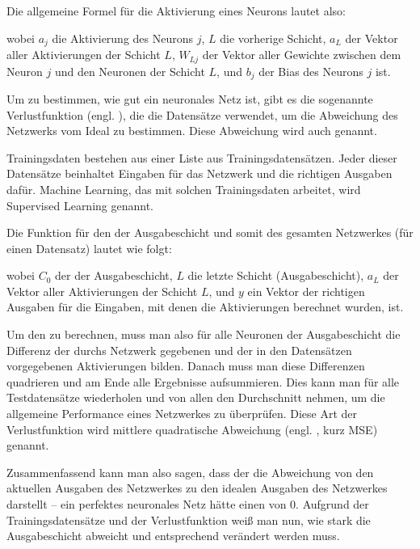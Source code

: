 \documentclass[11pt]{scrartcl}
\begin{document}
	Die allgemeine Formel für die Aktivierung eines Neurons lautet also:


	\form{
	\[
		\sig(x)=\frac{1}{1+e^{-x}}
		\]
	\[
		a_{j} = \sig\left(\sum_{L} (a_{L} * W_{Lj}) + b_{j}\right)
		\]}
	
	\noindent wobei $a_j$ die Aktivierung des Neurons $j$, $L$ die vorherige Schicht, $a_L$ der Vektor aller Aktivierungen der Schicht $L$, $W_{Lj}$ der Vektor aller Gewichte zwischen dem Neuron $j$ und den Neuronen der Schicht $L$, und $b_j$ der Bias des Neurons $j$ ist. \cite{brotcrunsher:forwardpass}	
	

	Um zu bestimmen, wie gut ein neuronales Netz ist, gibt es die sogenannte Verlustfunktion (engl. ), die die Datensätze verwendet, um die Abweichung des Netzwerks vom Ideal zu bestimmen. Diese Abweichung wird auch  genannt.

	Trainingsdaten bestehen aus einer Liste aus Trainingsdatensätzen. Jeder dieser Datensätze beinhaltet Eingaben für das Netzwerk und die richtigen Ausgaben dafür. Machine Learning, das mit solchen Trainingsdaten arbeitet, wird Supervised Learning genannt.

	Die Funktion für den  der Ausgabeschicht und somit des gesamten Netzwerkes (für einen Datensatz) lautet wie folgt:

	\form{ \[
		C_0 = (a_L - y)^2
	\]}


	\noindent wobei $C_0$ der  der Ausgabeschicht, $L$ die letzte Schicht (Ausgabeschicht), $a_L$ der Vektor aller Aktivierungen der Schicht $L$, und $y$ ein Vektor der richtigen Ausgaben für die Eingaben, mit denen die Aktivierungen berechnet wurden, ist. 
	
	Um den  zu berechnen, muss man also für alle Neuronen der Ausgabeschicht die Differenz der durchs Netzwerk gegebenen und der in den Datensätzen vorgegebenen Aktivierungen bilden. Danach muss man diese Differenzen quadrieren und am Ende alle Ergebnisse aufsummieren. Dies kann man für alle Testdatensätze wiederholen und von allen  den Durchschnitt nehmen, um die allgemeine Performance eines Netzwerkes zu überprüfen. Diese Art der Verlustfunktion wird mittlere quadratische Abweichung (engl. , kurz MSE) genannt.
	
	Zusammenfassend kann man also sagen, dass der  die Abweichung von den aktuellen Ausgaben des Netzwerkes zu den idealen Ausgaben des Netzwerkes darstellt -- ein perfektes neuronales Netz hätte einen  von 0. Aufgrund der Trainingsdatensätze und der Verlustfunktion weiß man nun, wie stark die Ausgabeschicht abweicht und entsprechend verändert werden muss.
\end{document}
